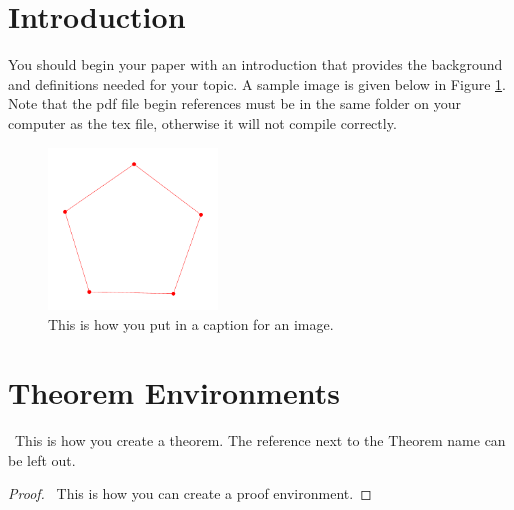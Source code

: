 \documentclass[10pt]{amsart}
\begin{document}
\maketitle





\section{Introduction}

You should begin your paper with an introduction that provides the background and definitions needed for your topic.  A sample image is given below in Figure \ref{picture}.  Note that the pdf file begin references must be in the same folder on your computer as the tex file, otherwise it will not compile correctly.


\begin{figure}[h!]
\centerline{
{\includegraphics[width=0.4\textwidth]{C5.pdf}}}\caption{This is how you put in a caption for an image.}\label{picture}
\end{figure} 

\section{Theorem Environments}

\begin{theorem}[Ramsey, 1930] \ This is how you create a theorem. The reference next to the Theorem name can be left out.  \label{theorem1}
\end{theorem}

\begin{proof} \ This is how you can create a proof environment.  \end{proof}
\end{document}
